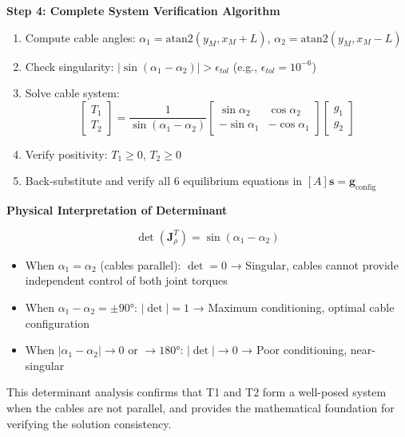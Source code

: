 \textbf{Step 4: Complete System Verification Algorithm}

\begin{enumerate}
    \item Compute cable angles: $\alpha_1 = \text{atan2}(y_M, x_M + L)$, $\alpha_2 = \text{atan2}(y_M, x_M - L)$
    
    \item Check singularity: $|\sin(\alpha_1 - \alpha_2)| > \epsilon_{tol}$ (e.g., $\epsilon_{tol} = 10^{-6}$)
    
    \item Solve cable system:
    $$\begin{bmatrix} T_1 \\ T_2 \end{bmatrix} = \frac{1}{\sin(\alpha_1 - \alpha_2)} \begin{bmatrix} \sin\alpha_2 & \cos\alpha_2 \\ -\sin\alpha_1 & -\cos\alpha_1 \end{bmatrix} \begin{bmatrix} g_1 \\ g_2 \end{bmatrix}$$
    
    \item Verify positivity: $T_1 \geq 0$, $T_2 \geq 0$
    
    \item Back-substitute and verify all 6 equilibrium equations in $[A]\mathbf{s} = \mathbf{g}_{\text{config}}$
\end{enumerate}

\textbf{Physical Interpretation of Determinant}

$$\det(\mathbf{J}_{\rho}^T) = \sin(\alpha_1 - \alpha_2)$$

\begin{itemize}
    \item When $\alpha_1 = \alpha_2$ (cables parallel): $\det = 0$ → Singular, cables cannot provide independent control of both joint torques
    \item When $\alpha_1 - \alpha_2 = \pm 90°$: $|\det| = 1$ → Maximum conditioning, optimal cable configuration
    \item When $|\alpha_1 - \alpha_2| \to 0$ or $\to 180°$: $|\det| \to 0$ → Poor conditioning, near-singular
\end{itemize}

This determinant analysis confirms that T1 and T2 form a well-posed system when the cables are not parallel, and provides the mathematical foundation for verifying the solution consistency.

